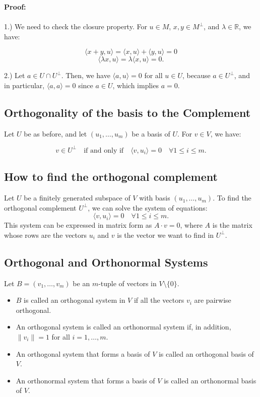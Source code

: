 \textbf{Proof:}
\\\\
1.) We need to check the closure property. For \( u \in M \), \( x, y \in M^\perp \), and \( \lambda \in \mathbb{R} \), we have:

\[
\langle x + y, u \rangle = \langle x, u \rangle + \langle y, u \rangle = 0
\]
\[
\langle \lambda x, u \rangle = \lambda \langle x, u \rangle = 0.
\]

2.) Let \( a \in U \cap U^\perp \). Then, we have \( \langle a, u \rangle = 0 \) for all \( u \in U \), because \( a \in U^\perp \), and in particular, \( \langle a, a \rangle = 0 \) since \( a \in U \), which implies \( a = 0 \).

\subsection{Orthogonality of the basis to the Complement}

Let \( U \) be as before, and let \( (u_1, \ldots, u_m) \) be a basis of \( U \). For \( v \in V \), we have:

\[
v \in U^\perp \quad \text{if and only if} \quad \langle v, u_i \rangle = 0 \quad \forall 1 \leq i \leq m.
\]

\subsection{How to find the orthogonal complement}
Let \( U \) be a finitely generated subspace of \( V \) with basis \( (u_1, \ldots, u_m) \). To find the orthogonal complement \( U^\perp \), we can solve the system of equations:
\[
\langle v, u_i \rangle = 0 \quad \forall 1 \leq i \leq m.
\]
This system can be expressed in matrix form as \( A \cdot v = 0 \), where \( A \) is the matrix whose rows are the vectors \( u_i \) and \( v \) is the vector we want to find in \( U^\perp \).

\subsection{Orthogonal and Orthonormal Systems}
Let \( B = (v_1, \ldots, v_m) \) be an \( m \)-tuple of vectors in \( V \setminus \{0\} \).
\begin{itemize}[label=\(-\)]
    \item \( B \) is called an orthogonal system in \( V \) if all the vectors \( v_i \) are pairwise orthogonal.
    \item An orthogonal system is called an orthonormal system if, in addition, \( \|v_i\| = 1 \) for all \( i = 1, \ldots, m \).
    \item An orthogonal system that forms a basis of \( V \) is called an orthogonal basis of \( V \).
    \item An orthonormal system that forms a basis of \( V \) is called an orthonormal basis of \( V \).
\end{itemize}

